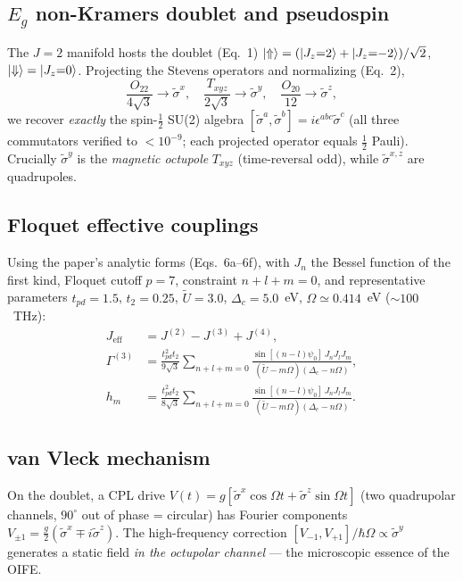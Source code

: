 \documentclass[aps,prb,twocolumn,superscriptaddress,floatfix]{revtex4-2}
\begin{document}
\subsection{$E_g$ non-Kramers doublet and pseudospin}
The $J=2$ manifold hosts the doublet (Eq.~1)
$\ket{\Uparrow}=(\ket{J_z{=}2}+\ket{J_z{=}{-}2})/\sqrt2$, $\ket{\Downarrow}=\ket{J_z{=}0}$.
Projecting the Stevens operators and normalizing (Eq.~2),
\begin{equation}
\frac{O_{22}}{4\sqrt3}\!\to\!\tilde\sigma^x,\quad
\frac{T_{xyz}}{2\sqrt3}\!\to\!\tilde\sigma^y,\quad
\frac{O_{20}}{12}\!\to\!\tilde\sigma^z,
\end{equation}
we recover \emph{exactly} the spin-$\tfrac12$ SU(2) algebra
$[\tilde\sigma^a,\tilde\sigma^b]=i\epsilon^{abc}\tilde\sigma^c$
(all three commutators verified to $<10^{-9}$; each projected operator equals
$\tfrac12$ Pauli). Crucially $\tilde\sigma^y$ is the \emph{magnetic octupole}
$T_{xyz}$ (time-reversal odd), while $\tilde\sigma^{x,z}$ are quadrupoles.

\subsection{Floquet effective couplings}
Using the paper's analytic forms (Eqs.~6a--6f), with $J_n$ the Bessel function
of the first kind, Floquet cutoff $p=7$, constraint $n{+}l{+}m=0$, and
representative parameters $t_{pd}{=}1.5$, $t_2{=}0.25$, $\tilde U{=}3.0$,
$\Delta_c{=}5.0$~eV, $\Omega\simeq0.414$~eV ($\sim100$~THz):
\begin{align}
J_\mathrm{eff}&=J^{(2)}-J^{(3)}+J^{(4)},\\
\Gamma^{(3)}&=\frac{t_{pd}^2 t_2}{9\sqrt3}\!\!\sum_{n+l+m=0}\!\!
\frac{\sin[(n{-}l)\psi_0]\,J_nJ_lJ_m}{(\tilde U{-}m\Omega)(\Delta_c{-}n\Omega)},\\
h_m&=\frac{t_{pd}^2 t_2}{8\sqrt3}\!\!\sum_{n+l+m=0}\!\!
\frac{\sin[(n{-}l)\psi_0]\,J_nJ_lJ_m}{(\tilde U{-}m\Omega)(\Delta_c{-}n\Omega)}.
\end{align}

\subsection{van Vleck mechanism}
On the doublet, a CPL drive
$V(t)=g[\tilde\sigma^x\cos\Omega t+\tilde\sigma^z\sin\Omega t]$ (two quadrupolar
channels, $90^\circ$ out of phase = circular) has Fourier components
$V_{\pm1}=\tfrac{g}{2}(\tilde\sigma^x\mp i\tilde\sigma^z)$. The high-frequency
correction $[V_{-1},V_{+1}]/\hbar\Omega\propto\tilde\sigma^y$ generates a static
field \emph{in the octupolar channel} --- the microscopic essence of the OIFE.
\end{document}
